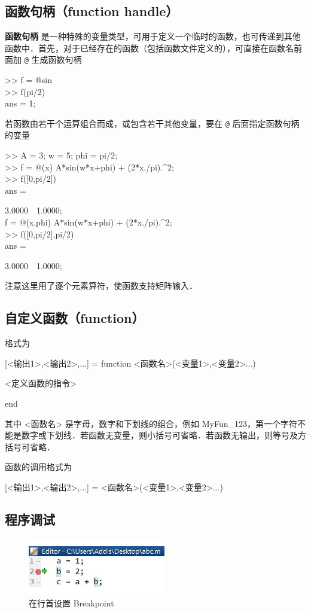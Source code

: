\subsection{函数句柄（function handle）}
\textbf{函数句柄} 是一种特殊的变量类型，可用于定义一个临时的函数，也可传递到其他函数中．首先，对于已经存在的函数（包括函数文件定义的），可直接在函数名前面加 \texttt{@} 生成函数句柄
\begin{Command}
>> f = @sin \\
>> f(pi/2) \\
ans = 1;
\end{Command}
若函数由若干个运算组合而成，或包含若干其他变量，要在 \texttt{@} 后面指定函数句柄的变量
\begin{Command}
>> A = 3; w = 5; phi = pi/2; \\
>> f = @(x) A*sin(w*x+phi) + (2*x./pi).\^{}2; \\
>> f([0,pi/2]) \\
ans = \par
3.0000\ \ 1.0000; \\
f = @(x,phi) A*sin(w*x+phi) + (2*x./pi).\^{}2; \\
>> f([0,pi/2],pi/2) \\
ans = \par
3.0000\ \ 1.0000;
\end{Command}
注意这里用了逐个元素算符，使函数支持矩阵输入．

\subsection{自定义函数（function）}
格式为

[<输出1>,<输出2>,...] = function <函数名>(<变量1>,<变量2>...)

<定义函数的指令>

end

其中 <函数名> 是字母，数字和下划线的组合，例如 MyFun\_123，第一个字符不能是数字或下划线．若函数无变量，则小括号可省略．若函数无输出，则等号及方括号可省略．

函数的调用格式为 %

[<输出1>,<输出2>,...] = <函数名>(<变量1>,<变量2>...)

\subsection{程序调试}
\begin{figure}[ht]
\centering
\includegraphics[width= 6cm]{./figures/Matlab3.pdf}
\caption{在行首设置 Breakpoint}\label{Matlab_fig3}
\end{figure}

